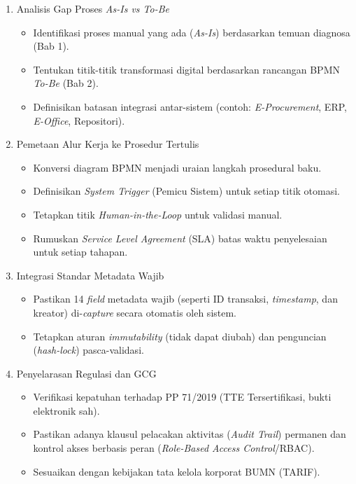 \documentclass[12pt,a4paper]{report}
\begin{document}
\begin{enumerate}[leftmargin=*]
\item Analisis Gap Proses \textit{As-Is vs \textit{To-Be}}
\begin{itemize}[nosep, leftmargin=*]
\item Identifikasi proses manual yang ada (\textit{As-Is}) berdasarkan temuan diagnosa (Bab 1).
\item Tentukan titik-titik transformasi digital berdasarkan rancangan BPMN \textit{To-Be} (Bab 2).
\item Definisikan batasan integrasi antar-sistem (contoh: \textit{E-Procurement}, ERP, \textit{E-Office}, Repositori).
\end{itemize}

\item Pemetaan Alur Kerja ke Prosedur Tertulis
\begin{itemize}[nosep, leftmargin=*]
\item Konversi diagram BPMN menjadi uraian langkah prosedural baku.
\item Definisikan \textit{System Trigger} (Pemicu Sistem) untuk setiap titik otomasi.
\item Tetapkan titik \textit{Human-in-the-Loop} untuk validasi manual.
\item Rumuskan \textit{Service Level Agreement} (SLA) batas waktu penyelesaian untuk setiap tahapan.
\end{itemize}

\item Integrasi Standar Metadata Wajib
\begin{itemize}[nosep, leftmargin=*]
\item Pastikan 14 \textit{field} metadata wajib (seperti ID transaksi, \textit{timestamp}, dan kreator) di-\textit{capture} secara otomatis oleh sistem.
\item Tetapkan aturan \textit{immutability} (tidak dapat diubah) dan penguncian (\textit{hash-lock}) pasca-validasi.
\end{itemize}

\item Penyelarasan Regulasi dan GCG
\begin{itemize}[nosep, leftmargin=*]
\item Verifikasi kepatuhan terhadap PP 71/2019 (TTE Tersertifikasi, bukti elektronik sah).
\item Pastikan adanya klausul pelacakan aktivitas (\textit{Audit Trail}) permanen dan kontrol akses berbasis peran (\textit{Role-Based Access Control}/RBAC).
\item Sesuaikan dengan kebijakan tata kelola korporat BUMN (TARIF).
\end{itemize}
\end{enumerate}
\end{document}
